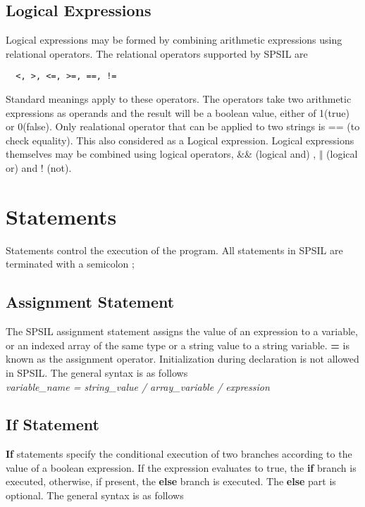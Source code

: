 \documentclass[11pt]{article}
\begin{document}
\subsection{Logical Expressions}

Logical expressions may be formed by combining arithmetic expressions using relational operators. The relational operators supported by SPSIL are \begin{verbatim}  <, >, <=, >=, ==, !=
\end{verbatim}
Standard  meanings apply to these operators. The operators take two arithmetic expressions as operands and the result will be a boolean value, either of 1(true) or 0(false). Only realational operator that can be applied to two strings is == (to check equality). This also considered as a Logical expression. Logical expressions themselves may be combined using logical operators, \&\& (logical and) ,  $\Vert$ (logical or) and ! (not).




\section{Statements}

Statements control the execution of the program. All statements in SPSIL are terminated with a semicolon ;





\subsection{Assignment Statement}
The SPSIL assignment statement assigns the value of an expression to a variable, or an indexed array of the same type or a string value to a string variable. \textbf{=} is known as the assignment operator. Initialization during declaration is not allowed in SPSIL. The general syntax is as follows \\
\textit{ variable\_name = string\_value / array\_variable / expression }






\subsection{If Statement}
\textbf{If} statements specify the conditional execution of two branches according to the value of a boolean expression. If the expression evaluates to true, the \textbf{if} branch is executed, otherwise, if present, the \textbf{else}  branch is executed. The \textbf{else} part is optional. The general syntax is as follows  \\
\end{document}
